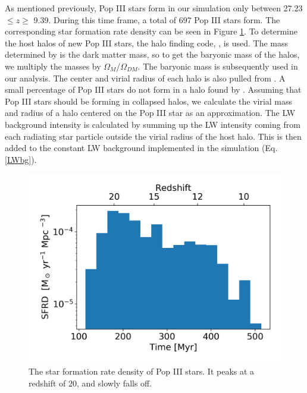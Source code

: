 \documentclass[a4paper,fleqn,usenatbib]{mnras}
\begin{document}
As mentioned previously, Pop III stars form in our simulation only between 27.23 $\leq z \geq$ 9.39. During this time frame, a total of 697 Pop III stars form. The corresponding star formation rate density can be seen in Figure \ref{fig:pop3_SFR_bar}. To determine the host halos of new Pop III stars, the halo finding code, \rockstar{} \citep{rockstar}, is used. The mass determined by \rockstar{} is the dark matter mass, so to get the baryonic mass of the halos, we multiply the masses by $\Omega_{M}$/$\Omega_{DM}$. The baryonic mass is subsequently used in our analysis. The center and virial radius of each halo is also pulled from \rockstar{}. A small percentage of Pop III stars do not form in a halo found by \rockstar{}. Assuming that Pop III stars should be forming in collapsed halos, we calculate the virial mass and radius of a halo centered on the Pop III star as an approximation. The LW background intensity is calculated by summing up the LW intensity coming from each radiating star particle outside the virial radius of the host halo. This is then added to the constant LW background implemented in the simulation (Eq. \ref{LWbg}). 

\begin{figure}
	\includegraphics[width=\columnwidth]{images/pop3_SFR_bar.png}
    \caption{The star formation rate density of Pop III stars. It peaks at a redshift of 20, and slowly falls off.}
    \label{fig:pop3_SFR_bar}
\end{figure}
\end{document}
